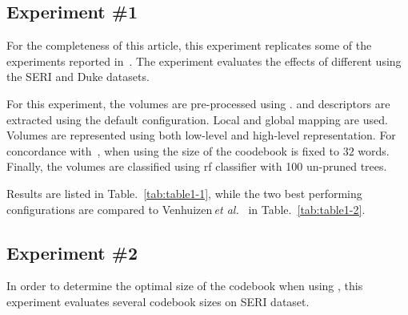 \subsection{Experiment \#1}\label{subsec:exp1}

%
%
%

For the completeness of this article, this experiment replicates some of the experiments reported in~\cite{Lemaintre2015miccaiOCT}.
The experiment evaluates the effects of different  using the SERI and Duke datasets.

For this experiment, the volumes are pre-processed using \nlm.
\lbp and \lbptop descriptors are extracted using the default configuration.
Local and global mapping are used.
Volumes are represented using both low-level and high-level representation. For concordance with~\cite{Lemaintre2015miccaiOCT}, when using \bow the size of the coodebook is fixed to $32$ words.
Finally, the volumes are classified using \ac{rf} classifier with 100 un-pruned trees.

Results are listed in Table.~\ref{tab:table1-1}, while the two best performing configurations are compared to Venhuizen\,\textit{et al.}~\cite{Venhuizen2015} in Table.~\ref{tab:table1-2}.





\subsection{Experiment \#2}\label{subsec:exp2}
%
%
%
%

In order to determine the optimal size of the codebook when using \bow, this experiment evaluates several codebook sizes on SERI dataset.

